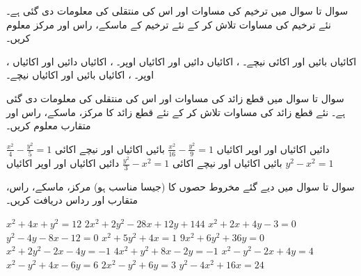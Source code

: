 سوال  تا سوال  میں ترخیم کی مساوات اور اس کی منتقلی کی معلومات دی گئی ہے۔ نئے ترخیم کی مساوات تلاش کر کے نئے ترخیم کے ماسکے، راس اور مرکز معلوم کریں۔

، 
\quad
{} اکائیاں بائیں اور  اکائی نیچے۔
، 
\quad
{} اکائیاں دائیں اور  اکائیاں اوپر۔
، 
\quad
{} اکائیاں دائیں اور  اکائیاں اوپر۔
، 
\quad
{} اکائیاں بائیں اور  اکائیاں نیچے۔


سوال  تا سوال  میں قطع زائد کی مساوات اور اس کی منتقلی کی معلومات دی گئی ہے۔ نئے قطع زائد کی مساوات تلاش کر کے نئے قطع زائد کا مرکز، ماسکے، راس اور متقارب معلوم کریں۔

$\tfrac{x^2}{4}-\tfrac{y^2}{5}=1$\quad
دائیں  اکائیاں اور اوپر  اکائیاں
$\tfrac{x^2}{16}-\tfrac{y^2}{9}=1$\quad
بائیں  اکائیاں اور نیچے  اکائی
$y^2-x^2=1$\quad
بائیں  اکائیاں اور نیچے  اکائی
$\tfrac{y^2}{3}-x^2=1$\quad
دائیں  اکائیاں اور اوپر  اکائیاں

سوال  تا سوال  میں دیے گئے مخروط حصوں کا (جیسا مناسب ہو) مرکز، ماسکے، راس، متقارب اور رداس دریافت کریں۔

$x^2+4x+y^2=12$
$2x^2+2y^2-28x+12y+144$
$x^2+2x+4y-3=0$
$y^2-4y-8x-12=0$
$x^2+5y^2+4x=1$
$9x^2+6y^2+36y=0$
$x^2+2y^2-2x-4y=-1$
$4x^2+y^2+8x-2y=-1$
$x^2-y^2-2x+4y=4$
$x^2-y^2+4x-6y=6$
$2x^2-y^2+6y=3$
$y^2-4x^2+16x=24$


